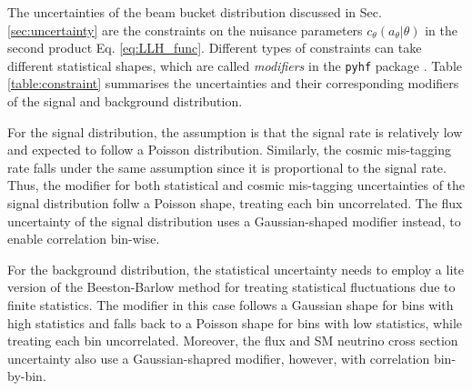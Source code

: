 The uncertainties of the beam bucket distribution discussed in Sec. \ref{sec:uncertainty} are the constraints on the nuisance parameters $c_\theta(a_\theta|\theta)$ in the second product Eq. \ref{eq:LLH_func}.
Different types of constraints can take different statistical shapes, which are called \textit{modifiers} in the \texttt{pyhf} package \cite{pyhf, pyhf_joss}.
Table \ref{table:constraint} summarises the uncertainties and their corresponding modifiers of the signal and background distribution.

For the signal distribution, the assumption is that the signal rate is relatively low and expected to follow a Poisson distribution.
Similarly, the cosmic mis-tagging rate falls under the same assumption since it is proportional to the signal rate. 
Thus, the modifier for both statistical and cosmic mis-tagging uncertainties of the signal distribution follw a Poisson shape, treating each bin uncorrelated. 
The flux uncertainty of the signal distribution uses a Gaussian-shaped modifier instead, to enable correlation bin-wise.

For the background distribution, the statistical uncertainty needs to employ a lite version of the Beeston-Barlow method \cite{BeestonBarlow} for treating statistical fluctuations due to finite statistics.
The modifier in this case follows a Gaussian shape for bins with high statistics and falls back to a Poisson shape for bins with low statistics, while treating each bin uncorrelated.
Moreover, the flux and SM neutrino cross section uncertainty also use a Gaussian-shapred modifier, however, with correlation bin-by-bin.  

